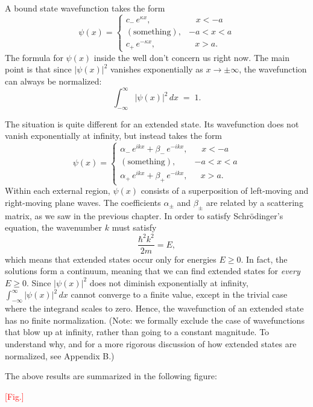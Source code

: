 \documentclass[pra,11pt]{revtex4}
\begin{document}
A bound state wavefunction takes the form
$$\psi(x) = \begin{cases} c_-\, e^{\kappa x}, & \;\;\;x < -a\\ (\mathrm{something}) , & -a < x < a\\ c_+\, e^{-\kappa x} , & \;\;\,x > a.\end{cases}$$
The formula for $\psi(x)$ inside the well don't concern us right now.
The main point is that since $|\psi(x)|^2$ vanishes exponentially as
$x \rightarrow \pm \infty$, the wavefunction can always be
normalized:
$$\int_{-\infty}^\infty |\psi(x)|^2\, dx\; =\; 1.$$

The situation is quite different for an extended state.  Its
wavefunction does not vanish exponentially at infinity, but instead
takes the form
$$\psi(x) = \begin{cases} \alpha_-\, e^{ik x} + \beta_-\, e^{-ik x}, & \;\;\;x < -a\\ (\mathrm{something}) , & -a < x < a\\ \alpha_+\, e^{ik x} + \beta_+\, e^{-ik x} , & \;\;\,x > a.\end{cases}$$
Within each external region, $\psi(x)$ consists of a superposition of
left-moving and right-moving plane waves.  The coefficients
$\alpha_\pm$ and $\beta_\pm$ are related by a scattering matrix, as we
saw in the previous chapter.  In order to satisfy Schr\"odinger's
equation, the wavenumber $k$ must satisfy
$$\frac{\hbar^2k^2}{2m} = E,$$
which means that extended states occur only for energies $E \ge 0$.
In fact, the solutions form a continuum, meaning that we can find
extended states for \textit{every} $E \ge 0$.  Since $|\psi(x)|^2$
does not diminish exponentially at infinity, $\int_{-\infty}^\infty
|\psi(x)|^2\, dx$ cannot converge to a finite value, except in the
trivial case where the integrand scales to zero.  Hence, the
wavefunction of an extended state has no finite normalization.  (Note:
we formally exclude the case of wavefunctions that blow up at
infinity, rather than going to a constant magnitude.  To understand
why, and for a more rigorous discussion of how extended states are
normalized, see Appendix B.)

The above results are summarized in the following figure:

\textcolor{red}{[Fig.]}

\end{document}
